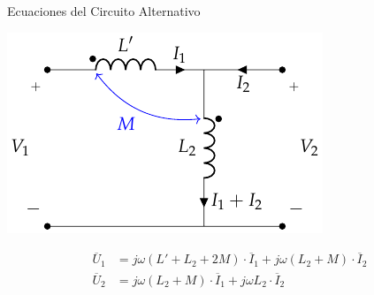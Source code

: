 \documentclass[xcolor={usenames,svgnames,dvipsnames}]{beamer}
\begin{document}
\begin{frame}[label={sec:org235db51}]{Ecuaciones del Circuito Alternativo}
\begin{center}
\includegraphics[height=0.5\textheight]{../figs/AutotrafoPerfecto2.pdf}
\end{center}
\begin{align*}
  \overline{U}_1 &= j \omega (L' + L_2 + 2M) \cdot \overline{I}_1 + j \omega (L_2 + M) \cdot \overline{I}_2\\
  \overline{U}_2 &= j \omega (L_2 + M) \cdot \overline{I}_1 + j \omega L_2 \cdot \overline{I}_2
\end{align*}
\end{frame}
\end{document}

